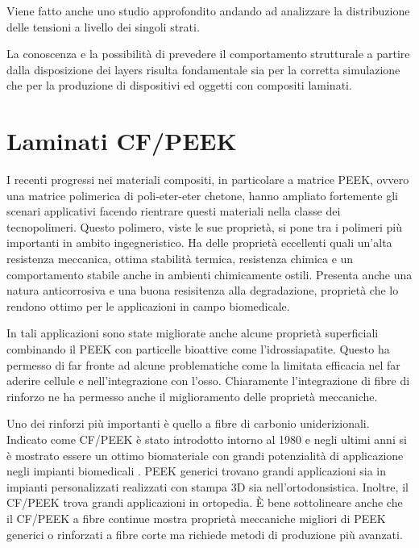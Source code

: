 \documentclass[a4paper,num-refs]{oup-contemporary}
\begin{document}
Viene fatto anche uno studio approfondito andando ad analizzare la distribuzione delle tensioni a livello dei singoli strati. 

La conoscenza e la possibilità di prevedere il comportamento strutturale a partire dalla disposizione dei layers risulta fondamentale sia per la corretta simulazione che per la produzione di dispositivi ed oggetti con compositi laminati. 


\section{Laminati CF/PEEK} 

I recenti progressi nei materiali compositi, in particolare a matrice PEEK, ovvero una matrice polimerica di poli-eter-eter chetone, hanno ampliato fortemente gli scenari applicativi facendo rientrare questi materiali nella classe dei tecnopolimeri. Questo polimero, viste le sue proprietà, si pone tra i polimeri più importanti in ambito ingegneristico. Ha delle proprietà eccellenti quali un'alta resistenza meccanica, ottima stabilità termica, resistenza chimica e un comportamento stabile anche in ambienti chimicamente ostili. Presenta anche una natura anticorrosiva e una buona resisitenza alla degradazione, proprietà che lo rendono ottimo per le applicazioni in campo biomedicale. 

In tali applicazioni sono state migliorate anche alcune proprietà superficiali combinando il PEEK con particelle bioattive come l'idrossiapatite. Questo ha permesso di far fronte ad alcune problematiche come la limitata efficacia nel far aderire cellule e nell'integrazione con l'osso.  Chiaramente l'integrazione di fibre di rinforzo ne ha permesso anche il miglioramento delle proprietà meccaniche. 

Uno dei rinforzi più importanti è quello a fibre di carbonio uniderizionali. Indicato come CF/PEEK è stato introdotto intorno al 1980 e negli ultimi anni si è mostrato essere un ottimo biomateriale con grandi potenzialità di applicazione negli impianti biomedicali \citep{Verma}.    
PEEK generici trovano grandi applicazioni sia in impianti personalizzati realizzati con stampa 3D sia nell'ortodonsistica. Inoltre, il CF/PEEK trova grandi applicazioni in ortopedia.  È bene sottolineare anche che il CF/PEEK a fibre continue mostra proprietà meccaniche migliori di PEEK generici o rinforzati a fibre corte ma richiede metodi di produzione più avanzati.
\end{document}
